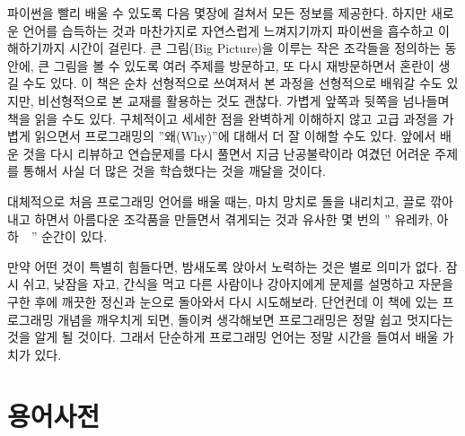 파이썬을 빨리 배울 수 있도록 다음 몇장에 걸쳐서 모든 정보를 제공한다. 
하지만 새로운 언어를 습득하는 것과 마찬가지로 자연스럽게 느껴지기까지 파이썬을 흡수하고 이해하기까지 시간이 걸린다. 
큰 그림(Big Picture)을 이루는 작은 조각들을 정의하는 동안에, 
큰 그림을 볼 수 있도록 여러 주제를 방문하고, 또 다시 재방문하면서 혼란이 생길 수도 있다.
이 책은 순차 선형적으로 쓰여져서 본 과정을 선형적으로 배워갈 수도 있지만, 비선형적으로 본 교재를 활용하는 것도 괜찮다. 
가볍게 앞쪽과 뒷쪽을 넘나들며 책을 읽을 수도 있다. 
구체적이고 세세한 점을 완벽하게 이해하지 않고 고급 과정을 가볍게 읽으면서 프로그래밍의 ''왜(Why)''에 대해서 더 잘 이해할 수도 있다. 
앞에서 배운 것을 다시 리뷰하고 연습문제를 다시 풀면서 지금 난공불락이라 여겼던 어려운 주제를 통해서 사실 더 많은 것을 학습했다는 것을 깨달을 것이다.

대체적으로 처음 프로그래밍 언어를 배울 때는, 
마치 망치로 돌을 내리치고, 끌로 깎아내고 하면서 아름다운 조각품을 만들면서 겪게되는 것과 유사한 몇 번의 '' 유레카, 아 하~~'' 순간이 있다.

만약 어떤 것이 특별히 힘들다면, 밤새도록 앉아서 노력하는 것은 별로 의미가 없다. 
잠시 쉬고, 낮잠을 자고, 간식을 먹고 다른 사람이나 강아지에게 문제를 설명하고 자문을 구한 후에 깨끗한 정신과 눈으로 돌아와서 다시 시도해보라. 
단언컨데 이 책에 있는 프로그래밍 개념을 깨우치게 되면, 돌이켜 생각해보면 프로그래밍은 정말 쉽고 멋지다는 것을 알게 될 것이다. 
그래서 단순하게 프로그래밍 언어는 정말 시간을 들여서 배울 가치가 있다.

\section{용어사전}

